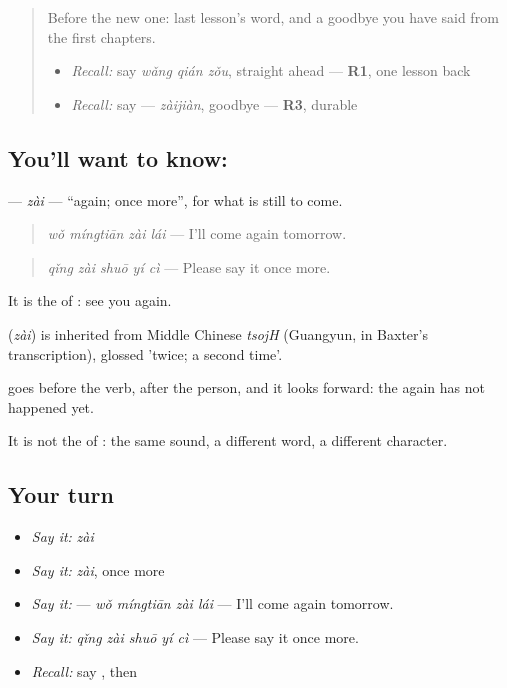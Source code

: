 \label{lesson:ZH-C283-zai-again}



\begin{quote}
Before the new one: last lesson's word, and a goodbye you have said from the first chapters.

\begin{itemize}
\raggedright
  \item \emph{Recall:} say \emph{wǎng qián zǒu}, straight ahead — \textbf{R1}, one lesson back
  \item \emph{Recall:} say  — \emph{zàijiàn}, goodbye — \textbf{R3}, durable
\end{itemize}
\end{quote}

\subsection*{You'll want to know: }
\textbf{} — \emph{zài} — \textquotedblleft{}again; once more\textquotedblright{}, for what is still to come.

\begin{quote}
\textbf{} \emph{wǒ míngtiān zài lái} — I'll come again tomorrow.
\end{quote}

\begin{quote}
\emph{qǐng zài shuō yí cì} — Please say it once more.
\end{quote}

It is the  of : see you again.

\begin{cousinweb}
\textbf{} (\emph{zài}) is inherited from Middle Chinese \emph{tsojH} (Guangyun, in Baxter's transcription), glossed 'twice; a second time'.
\end{cousinweb}

\begin{grammarlens}[title={What you've built}]
 goes before the verb, after the person, and it looks forward: the again has not happened yet.

It is not the  of : the same sound, a different word, a different character.
\end{grammarlens}

\subsection*{Your turn}
\begin{itemize}
\raggedright
  \item \emph{Say it:} \emph{zài}
  \item \emph{Say it:} \emph{zài}, once more
  \item \emph{Say it:}  — \emph{wǒ míngtiān zài lái} — I'll come again tomorrow.
  \item \emph{Say it:} \emph{qǐng zài shuō yí cì} — Please say it once more.
  \item \emph{Recall:} say , then 
\end{itemize}

